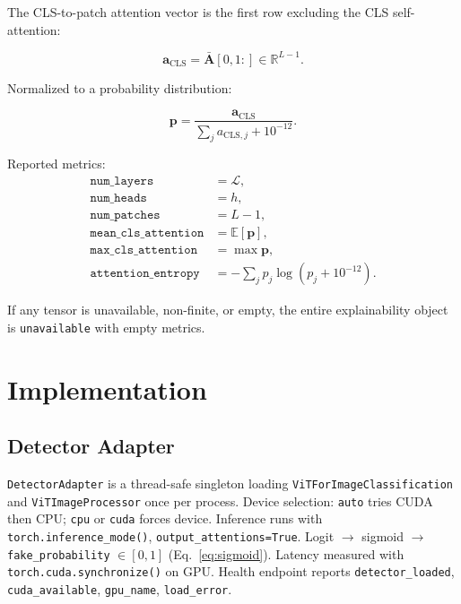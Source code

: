 \documentclass[10pt,conference,compsoc]{IEEEtran}
\begin{document}
The CLS-to-patch attention vector is the first row excluding the CLS self-attention:

\begin{equation}
\mathbf{a}_{\mathrm{CLS}} = \bar{\mathbf{A}}[0, 1:] \in \mathbb{R}^{L-1}.
\label{eq:cls-patches}
\end{equation}

Normalized to a probability distribution:

\begin{equation}
\mathbf{p} = \frac{\mathbf{a}_{\mathrm{CLS}}}{\sum_j a_{\mathrm{CLS},j} + 10^{-12}}.
\label{eq:cls-probs}
\end{equation}

Reported metrics:
\begin{align}
\texttt{num\_layers} &= \mathcal{L}, \\
\texttt{num\_heads} &= h, \\
\texttt{num\_patches} &= L-1, \\
\texttt{mean\_cls\_attention} &= \mathbb{E}[\mathbf{p}], \\
\texttt{max\_cls\_attention} &= \max \mathbf{p}, \\
\texttt{attention\_entropy} &= -\sum_j p_j \log(p_j + 10^{-12}).
\label{eq:attn-metrics}
\end{align}

If any tensor is unavailable, non-finite, or empty, the entire explainability object is \texttt{unavailable} with empty metrics.

\section{Implementation}
\label{sec:implementation}

\subsection{Detector Adapter}
\label{sec:detector-impl}

\texttt{DetectorAdapter} is a thread-safe singleton loading \texttt{ViTForImageClassification} and \texttt{ViTImageProcessor} once per process.
Device selection: \texttt{auto} tries CUDA then CPU; \texttt{cpu} or \texttt{cuda} forces device.
Inference runs with \texttt{torch.inference\_mode()}, \texttt{output\_attentions=True}.
Logit $\to$ sigmoid $\to$ \texttt{fake\_probability} $\in [0,1]$ (Eq.~\ref{eq:sigmoid}).
Latency measured with \texttt{torch.cuda.synchronize()} on GPU.
Health endpoint reports \texttt{detector\_loaded}, \texttt{cuda\_available}, \texttt{gpu\_name}, \texttt{load\_error}.
\end{document}
